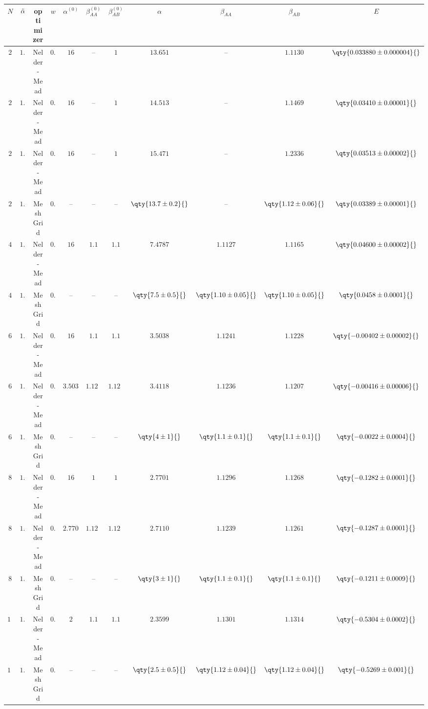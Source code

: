 \begin{tabular}{cc|ccccc|cccc}
    $N$ & $\Tilde{\alpha}$ & optimizer & $w$ & $\alpha^{(0)}$ & $\beta_{AA}^{(0)}$ & $\beta_{AB}^{(0)}$ & $\alpha$ & $\beta_{AA}$ & $\beta_{AB}$ & $E$ \\ \hline \hline

    \rowcolor{LightCyan}
    $2$ & $1.00$ & Nelder-Mead & $0.05$ & $16$ & -- & $1$ & $13.651$ & -- & $1.1130$ & $\qty{0.033880 \pm 0.000004}{}$ \\
    $2$ & $1.00$ & Nelder-Mead\tnote{$\dagger$} & $0.05$ & $16$ & -- & $1$ & $14.513$ & -- & $1.1469$ & $\qty{0.03410 \pm 0.00001}{}$ \\
    $2$ & $1.00$ & Nelder-Mead\tnote{$\ddagger$} & $0.05$ & $16$ & -- & $1$ & $15.471$ & -- & $1.2336$ & $\qty{0.03513 \pm 0.00002}{}$ \\
    $2$ & $1.00$ & Mesh Grid & $0.00$ & -- & -- & -- & $\qty{13.7 \pm 0.2}{}$ & -- & $\qty{1.12 \pm 0.06}{}$ & $\qty{0.03389 \pm 0.00001}{}$ \\
    \rowcolor{LightCyan}
    $4$ & $1.00$ & Nelder-Mead & $0.05$ & $16$ & $1.1$ & $1.1$ & $7.4787$ & $1.1127$ & $1.1165$ & $\qty{0.04600 \pm 0.00002}{}$ \\
    $4$ & $1.00$ & Mesh Grid & $0.00$ & -- & -- & -- & $\qty{7.5 \pm 0.5}{}$ & $\qty{1.10 \pm 0.05}{}$ & $\qty{1.10 \pm 0.05}{}$ & $\qty{0.0458 \pm 0.0001}{}$ \\
    $6$ & $1.00$ & Nelder-Mead & $0.05$ & $16$ & $1.1$ & $1.1$ & $3.5038$ & $1.1241$ & $1.1228$ & $\qty{-0.00402 \pm 0.00002}{}$ \\
    \rowcolor{LightCyan}
    $6$ & $1.00$ & Nelder-Mead\tnote{$**$} & $0.05$ & $3.5038$ & $1.1241$ & $1.1228$ & $3.4118$ & $1.1236$ & $1.1207$ & $\qty{-0.00416 \pm 0.00006}{}$ \\
    $6$ & $1.00$ & Mesh Grid & $0.00$ & -- & -- & -- & $\qty{4 \pm 1}{}$ & $\qty{1.1 \pm 0.1}{}$ & $\qty{1.1 \pm 0.1}{}$ & $\qty{-0.0022 \pm 0.0004}{}$ \\
    $8$ & $1.00$ & Nelder-Mead & $0.05$ & $16$ & $1$ & $1$ & $2.7701$ & $1.1296$ & $1.1268$ & $\qty{-0.1282 \pm 0.0001}{}$ \\
    \rowcolor{LightCyan}
    $8$ & $1.00$ & Nelder-Mead\tnote{$**$} & $0.05$ & $2.7701$ & $1.1296$ & $1.1268$ & $2.7110$ & $1.1239$ & $1.1261$ & $\qty{-0.1287 \pm 0.0001}{}$ \\
    $8$ & $1.00$ & Mesh Grid & $0.00$ & -- & -- & -- & $\qty{3 \pm 1}{}$ & $\qty{1.1 \pm 0.1}{}$ & $\qty{1.1 \pm 0.1}{}$ & $\qty{-0.1211 \pm 0.0009}{}$ \\
    \rowcolor{LightCyan}
    $12$\tnote{$*$} & $1.00$ & Nelder-Mead & $0.05$ & $2$ & $1.1$ & $1.1$ & $2.3599$ & $1.1301$ & $1.1314$ & $\qty{-0.5304 \pm 0.0002}{}$ \\
    $12$\tnote{$*$} & $1.00$ & Mesh Grid & $0.00$ & -- & -- & -- & $\qty{2.5 \pm 0.5}{}$ & $\qty{1.12 \pm 0.04}{}$ & $\qty{1.12 \pm 0.04}{}$ & $\qty{-0.5269 \pm 0.001}{}$ \\ \hline


\end{tabular}
